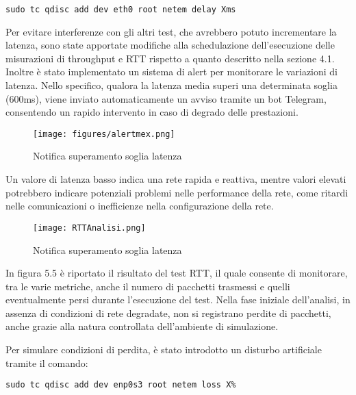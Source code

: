 \documentclass[12pt,a4paper]{report}
\begin{document}
\begin{lstlisting}
sudo tc qdisc add dev eth0 root netem delay Xms
\end{lstlisting}



Per evitare interferenze con gli altri test, che avrebbero potuto incrementare la latenza, sono state apportate modifiche alla schedulazione dell'esecuzione delle misurazioni di throughput e RTT rispetto a quanto descritto nella sezione 4.1. Inoltre è stato implementato un sistema di alert per monitorare le variazioni di latenza. Nello specifico, qualora la latenza media superi una determinata soglia (600ms), viene inviato automaticamente un avviso tramite un bot Telegram, consentendo un rapido intervento in caso di degrado delle prestazioni.

\begin{figure}[h]
    \centering
    \texttt{[image: figures/alertmex.png]}
    \caption{Notifica superamento soglia latenza}
    \label{fig:enter-label}
\end{figure}



Un valore di latenza basso indica una rete rapida e reattiva, mentre valori elevati potrebbero indicare potenziali problemi nelle performance della rete, come ritardi nelle comunicazioni o inefficienze nella configurazione della rete.

\newpage

\begin{figure}[h]
    \centering
    \texttt{[image: RTTAnalisi.png]}
    \caption{Notifica superamento soglia latenza}
    \label{fig:enter-label}
\end{figure}





In figura 5.5 è riportato il risultato del test RTT, il quale consente di monitorare, tra le varie metriche, anche il numero di pacchetti trasmessi e quelli eventualmente persi durante l’esecuzione del test. Nella fase iniziale dell’analisi, in assenza di condizioni di rete degradate, non si registrano perdite di pacchetti, anche grazie alla natura controllata dell’ambiente di simulazione.

Per simulare condizioni di perdita, è stato introdotto un disturbo artificiale tramite il comando:
\begin{lstlisting} 
sudo tc qdisc add dev enp0s3 root netem loss X% 
\end{lstlisting}
\end{document}
